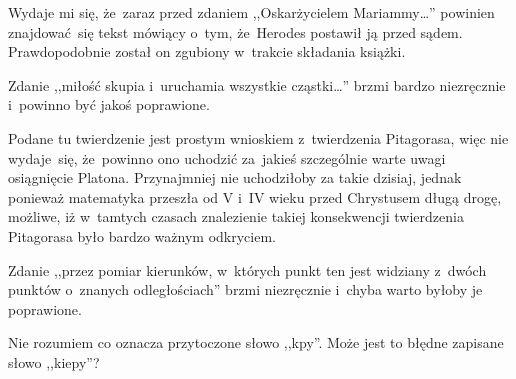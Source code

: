 \documentclass[a4paper,11pt]{article}
\begin{document}



\start {} Wydaje mi się, że~zaraz przed zdaniem
,,Oskarżycielem Mariammy\ldots'' powinien znajdować~się tekst mówiący
o~tym, że~Herodes postawił ją przed sądem. Prawdopodobnie został on
zgubiony w~trakcie składania książki.

\vspace{\spaceFour}


\start {} Zdanie ,,miłość skupia i~uruchamia wszystkie
cząstki\ldots'' brzmi bardzo niezręcznie i~powinno być jakoś
poprawione.

\vspace{\spaceFour}


\start {} Podane tu twierdzenie jest prostym wnioskiem
z~twierdzenia Pitagorasa, więc nie wydaje~się, że~powinno ono uchodzić
za~jakieś szczególnie warte uwagi osiągnięcie Platona. Przynajmniej
nie uchodziłoby za takie dzisiaj, jednak ponieważ matematyka przeszła
od V i~IV wieku przed Chrystusem długą drogę, możliwe, iż w~tamtych
czasach znalezienie takiej konsekwencji twierdzenia Pitagorasa było
bardzo ważnym odkryciem.

\vspace{\spaceFour}


\start {} Zdanie ,,przez pomiar kierunków, w~których punkt
ten jest widziany z~dwóch punktów o~znanych odległościach'' brzmi
niezręcznie i~chyba warto byłoby je poprawione.

\vspace{\spaceFour}


\start {} Nie rozumiem co oznacza przytoczone słowo
,,kpy''. Może jest to błędne zapisane słowo ,,kiepy''?

\vspace{\spaceFour}







\end{document}
